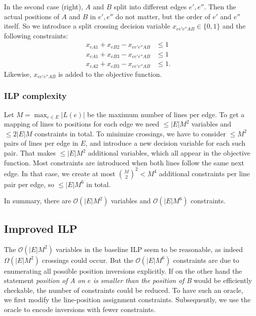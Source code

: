 \documentclass{llncs}
\begin{document}
In the second case (right), $A$ and $B$ split into different edges $e', e''$. Then the actual positions of $A$ and $B$ in $e', e''$ do not matter, but the order of $e'$ and $e''$ itself. So we introduce a split crossing decision variable $x_{ee'e''AB} \in \{0,1\}$ and the following constraints:
\begin{align*}
	x_{eA1} + x_{eB2} - x_{ee'e''AB} &\leq 1 \\
	x_{eA1} + x_{eB3} - x_{ee'e''AB} &\leq 1 \\
	x_{eA2} + x_{eB3} - x_{ee'e''AB} &\leq 1.
\end{align*}
Likewise, $x_{ee'e''AB}$ is added to the objective function.

\subsubsection{ILP complexity}
Let $M = \max_{e \in E} |L(e)|$ be the maximum number of lines per edge. To get a mapping of lines to positions for each edge we need $\leq |E|M^{2}$ variables and $\leq 2|E|M$ constraints in total. To minimize crossings, we have to consider $\leq M^{2}$ pairs of lines per edge in $E$, and introduce a new decision variable for each such pair. That makes $\leq |E| M^{2}$ additional variables, which all appear in the objective function. Most constraints are introduced when both lines follow the same next edge. In that case, we create at most $\binom{M}{2}^{2} < M^{4}$ additional constraints per line pair per edge, so $\leq |E| M^{6}$ in total.

In summary, there are $\mathcal{O}(|E|M^{2})$ variables and $\mathcal{O}(|E|M^{6})$ constraints.

%
\subsection{Improved ILP}\label{SEC:improved}
%
The $\mathcal{O}(|E|M^{2})$ variables in the baseline ILP seem to be reasonable, as indeed $\Omega(|E|M^{2})$ crossings could occur. But the $\mathcal{O}(|E|M^{6})$ constraints are due to enumerating all possible position inversions explicitly. If on the other hand the statement \emph{position of A on $e$ is smaller than the position of B} would be efficiently checkable, the number of constraints could be reduced. To have such an oracle, we first modify the line-position assignment constraints. Subsequently, we use the oracle to encode inversions with fewer constraints.
\end{document}
